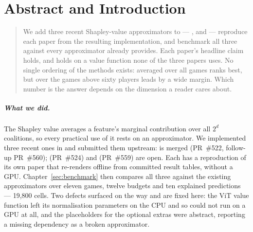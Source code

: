%
\chapter{Abstract and Introduction}
\label{sec:introduction}

\begin{quotation}
\noindent
We add three recent Shapley-value approximators to \shapiq{} --- \leverageshap{}
\citep{Witter.2025a}, \polyshap{} \citep{Fumagalli.2026a} and \oddshap{}
\citep{Fumagalli.2026} --- reproduce each paper from the resulting implementation, and
benchmark all three against every approximator \shapiq{} already provides. Each paper's
headline claim holds, and holds on a value function none of the three papers uses. No single
ordering of the methods exists: averaged over all games \leverageshap{} ranks best, but over
the games above sixty players \oddshap{} leads by a wide margin. Which number is the answer
depends on the dimension a reader cares about.
\end{quotation}

\paragraph{What we did.}
The Shapley value averages a feature's marginal contribution over all $2^d$ coalitions, so
every practical use of it rests on an approximator. We implemented three recent ones in
\shapiq{} \citep{Muschalik.2024b} and submitted them upstream: \oddshap{} is merged
(PR~\#522, follow-up PR~\#560); \leverageshap{} (PR~\#524) and \polyshap{} (PR~\#559) are
open. Each has a reproduction of its own paper that re-renders offline from committed result
tables, without a GPU. Chapter~\ref{sec:benchmark} then compares all three against the
existing \shapiq{} approximators over eleven games, twelve budgets and ten explained
predictions --- 19{,}800 cells. Two \shapiq{} defects surfaced on the way and are fixed here:
the ViT value function left its normalisation parameters on the CPU and so could not run on a
GPU at all, and the placeholders for the optional extras were abstract, reporting a missing
dependency as a broken approximator.


